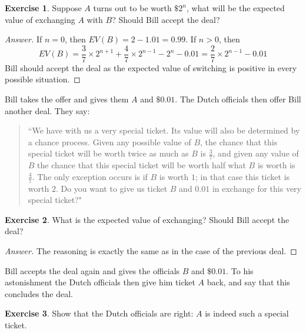 \documentclass[11pt]{article}
\theoremstyle{definition}
\newtheorem{exer}{Exercise}
\begin{document}
\begin{exer}
Suppose $A$ turns out to be worth $\$ 2^n$, what will be the expected value of exchanging $A$ with $B$? Should Bill accept the deal?
\end{exer}

\begin{proof}[Answer]
If $n = 0$, then $EV(B) = 2 - 1.01 = 0.99$. 
If $n > 0$, then
$$EV(B) = \frac{3}{7} \times 2^{n+1} + \frac{4}{7} \times 2^{n-1} -2^n - 0.01 = \frac{2}{7} \times 2^{n-1} - 0.01$$
Bill should accept the deal as the expected value of switching is positive in every possible situation.

\end{proof}

Bill takes the offer and gives them $A$ and $\$ 0.01$. The Dutch officials then offer Bill another deal. They say: 

\begin{quote}
``We have with us a very special ticket. Its value will also be determined by a chance process. Given any possible value of $B$, the chance that this special ticket will be worth twice as much as $B$ is $\frac{3}{7}$, and given any value of $B$ the chance that this special ticket will be worth half what $B$ is worth is $\frac{4}{7}$. The only exception occurs is if $B$ is worth $1$; in that case this ticket is worth $2$. Do you want to give us ticket $B$ and $0.01$ in exchange for this very special ticket?"
\end{quote}



\begin{exer}
What is the expected value of exchanging? Should Bill accept the deal?
\end{exer}

\begin{proof}[Answer]
The reasoning is exactly the same as in the case of the previous deal.

\end{proof}

Bill accepts the deal again and gives the officials $B$ and $\$ 0.01$. To his astonishment the Dutch officials then give him ticket $A$ back, and say that this concludes the deal.

\begin{exer}
Show that the Dutch officials are right: $A$ is indeed such a special ticket.
\end{exer}
\end{document}
